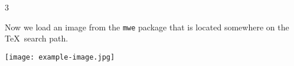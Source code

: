 \documentclass[../../../main.tex]{subfiles}
\begin{document}
3

Now we load an image from the \verb|mwe| package that is located
somewhere on the \TeX\ search path.
\begin{center}
\texttt{[image: example-image.jpg]}
\end{center}
\end{document}
